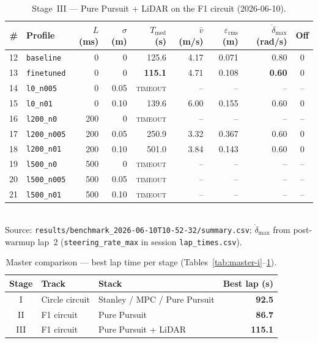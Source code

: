 \documentclass[11pt,a4paper]{article}
\newcommand{\runref}[1]{\texttt{results/#1}}
\newcommand{\best}[1]{\textbf{#1}}
\newcommand{\fail}{\textsc{timeout}}
\newcommand{\ndash}{--}
\newcommand{\cfg}[1]{\texttt{\small #1}}
\begin{document}
\begin{table}[H]
  \centering
  \caption{Stage~III --- Pure Pursuit + LiDAR on the F1 circuit (2026-06-10).}
  \label{tab:master-iii}
  \small
  \setlength{\tabcolsep}{4pt}
  \begin{tabular}{@{}r l rr r r r r c@{}}
    \toprule
    \# & Profile & $L$ (ms) & $\sigma$ (m) &
    $T_{\mathrm{med}}$ (s) & $\bar{v}$ (m/s) & $\varepsilon_{\mathrm{rms}}$ (m) &
    $\dot{\delta}_{\max}$ (rad/s) & Off \\
    \midrule
    12 & \cfg{baseline}        & 0   & 0    & 125.6 & 4.17 & 0.071 &  0.80 & 0 \\
    13 & \cfg{finetuned}       & 0   & 0    & \best{115.1} & 4.71 & 0.108 & \best{0.60} & 0 \\
    14 & \cfg{l0\_n005}        & 0   & 0.05 & \fail & \ndash & \ndash & \ndash & \ndash \\
    15 & \cfg{l0\_n01}         & 0   & 0.10 & 139.6 & 6.00 & 0.155 &  0.60 & 0 \\
    16 & \cfg{l200\_n0}        & 200 & 0    & \fail & \ndash & \ndash & \ndash & \ndash \\
    17 & \cfg{l200\_n005}      & 200 & 0.05 & 250.9 & 3.32 & 0.367 &  0.60 & 0 \\
    18 & \cfg{l200\_n01}       & 200 & 0.10 & 501.0 & 3.84 & 0.143 &  0.60 & 0 \\
    19 & \cfg{l500\_n0}        & 500 & 0    & \fail & \ndash & \ndash & \ndash & \ndash \\
    20 & \cfg{l500\_n005}      & 500 & 0.05 & \fail & \ndash & \ndash & \ndash & \ndash \\
    21 & \cfg{l500\_n01}       & 500 & 0.10 & \fail & \ndash & \ndash & \ndash & \ndash \\
    \bottomrule
  \end{tabular}
  \\[0.3em]
  \footnotesize
  Source: \runref{benchmark\_2026-06-10T10-52-32/summary.csv};
  $\dot{\delta}_{\max}$ from post-warmup lap~2
  (\texttt{steering\_rate\_max} in session \texttt{lap\_times.csv}).
\end{table}

\begin{table}[H]
  \centering
  \caption{Master comparison --- best lap time per stage (Tables~\ref{tab:master-i}--\ref{tab:master-iii}).}
  \label{tab:master}
  \begin{tabular}{@{}cllr@{}}
    \toprule
    Stage & Track & Stack & Best lap (s) \\
    \midrule
    I   & Circle circuit & Stanley / MPC / Pure Pursuit & \best{92.5} \\
    II  & F1 circuit     & Pure Pursuit               & \best{86.7} \\
    III & F1 circuit     & Pure Pursuit + LiDAR       & \best{115.1} \\
    \bottomrule
  \end{tabular}
\end{table}
\end{document}

